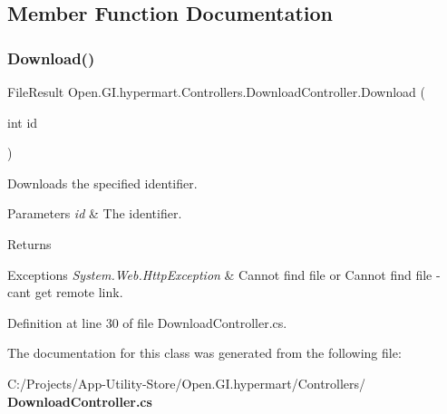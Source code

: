 \subsection{Member Function Documentation}
\mbox{\label{class_open_1_1_g_i_1_1hypermart_1_1_controllers_1_1_download_controller_a272d3e80defa78e91555596d44891c47}} 
\subsubsection{Download()}
{\footnotesize\ttfamily File\+Result Open.\+G\+I.\+hypermart.\+Controllers.\+Download\+Controller.\+Download (\begin{DoxyParamCaption}\item[{int}]{id }\end{DoxyParamCaption})}



Downloads the specified identifier. 


\begin{DoxyParams}{Parameters}
{\em id} & The identifier.\\
\hline
\end{DoxyParams}
\begin{DoxyReturn}{Returns}

\end{DoxyReturn}

\begin{DoxyExceptions}{Exceptions}
{\em System.\+Web.\+Http\+Exception} & Cannot find file or Cannot find file -\/ can\textquotesingle{}t get remote link. \\
\hline
\end{DoxyExceptions}


Definition at line 30 of file Download\+Controller.\+cs.



The documentation for this class was generated from the following file\+:\begin{DoxyCompactItemize}
\item 
C\+:/\+Projects/\+App-\/\+Utility-\/\+Store/\+Open.\+G\+I.\+hypermart/\+Controllers/\textbf{ Download\+Controller.\+cs}\end{DoxyCompactItemize}
